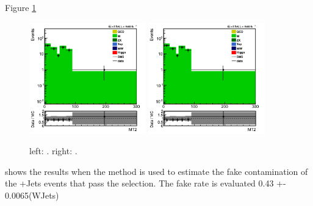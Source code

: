 Figure \ref{fig:LepTauClusure}
\begin{figure}[h]
\centering
\includegraphics[width=0.45\textwidth,keepaspectratio=true]{FakeRateMuTau/Estimation_pfWJets_ExtraLepExcl_SameSignWeightedHiggs.png}
\includegraphics[width=0.45\textwidth,keepaspectratio=true]{FakeRateMuTau/Estimation_pfWJets_ExtraLepExcl_SameSignWeightedHiggs.png}
\caption{left: . right: .}
\label{fig:LepTauClusure}
\end{figure}
shows the results when the method is used to estimate the fake contamination of the \Wpm+Jets events that pass the selection. 
The fake rate is evaluated 0.43 +- 0.0065(WJets)
